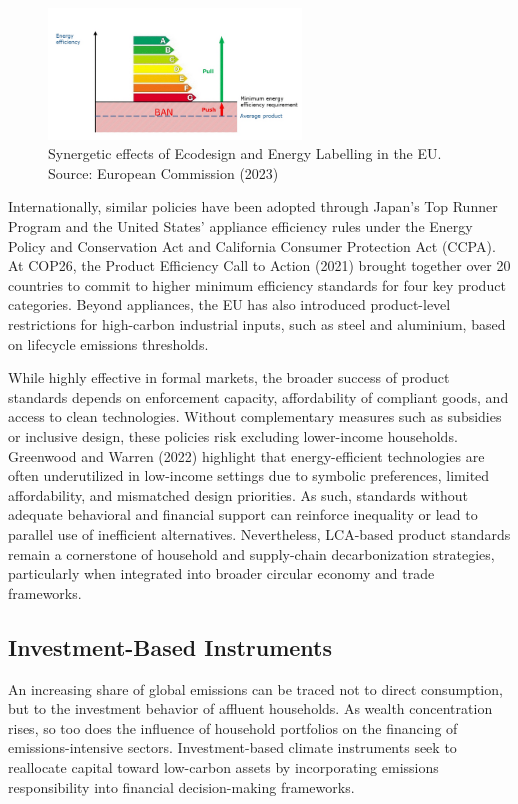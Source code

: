 \documentclass[12pt,a4paper]{article}%
\begin{document}
\begin{figure}[htbp]
  \centering
  \includegraphics[width=0.6\textwidth]{ecodesign.png}
  \caption{\small{Synergetic effects of Ecodesign and Energy Labelling in the EU. Source: European Commission (2023)}}\label{fig:ecodesign}
\end{figure}

Internationally, similar policies have been adopted through Japan’s Top Runner Program and the United States’ appliance efficiency rules under the Energy Policy and Conservation Act and California Consumer Protection Act (CCPA). At COP26, the Product Efficiency Call to Action (2021) brought together over 20 countries to commit to higher minimum efficiency standards for four key product categories. Beyond appliances, the EU has also introduced product-level restrictions for high-carbon industrial inputs, such as steel and aluminium, based on lifecycle emissions thresholds.

While highly effective in formal markets, the broader success of product standards depends on enforcement capacity, affordability of compliant goods, and access to clean technologies. Without complementary measures such as subsidies or inclusive design, these policies risk excluding lower-income households. Greenwood and Warren (2022) highlight that energy-efficient technologies are often underutilized in low-income settings due to symbolic preferences, limited affordability, and mismatched design priorities. As such, standards without adequate behavioral and financial support can reinforce inequality or lead to parallel use of inefficient alternatives. Nevertheless, LCA-based product standards remain a cornerstone of household and supply-chain decarbonization strategies, particularly when integrated into broader circular economy and trade frameworks.

\subsection{Investment-Based Instruments}
An increasing share of global emissions can be traced not to direct consumption, but to the investment behavior of affluent households. As wealth concentration rises, so too does the influence of household portfolios on the financing of emissions-intensive sectors. Investment-based climate instruments seek to reallocate capital toward low-carbon assets by incorporating emissions responsibility into financial decision-making frameworks.
\end{document}
